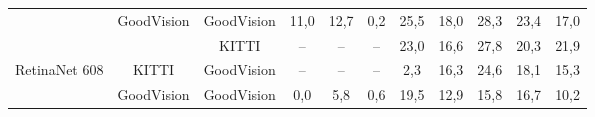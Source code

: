 \documentclass[twoside]{ctuthesis}
\theoremstyle{plain}
\theoremstyle{definition}
\theoremstyle{note}
\begin{document}
\begin{table}
{\begin{tabular}{|c|c|c|c|c|c|c|c|c|c|c|}
                                                         & GoodVision                                                          & GoodVision                                                         & 11,0                                                                   & 12,7                                                               & 0,2                                                                       & 25,5                                                               & 18,0                                                                  & 28,3                                                                 & 23,4                                                               & 17,0                                                            \\ \cline{2-11} 
                                                         &                                                                     & KITTI                                                              & --                                                                     & --                                                                 & --                                                                        & 23,0                                                               & 16,6                                                                  & 27,8                                                                 & 20,3                                                               & 21,9                                                            \\ \cline{3-11} 
\multirow{-3}{*}{RetinaNet 608}                          & \multirow{-2}{*}{KITTI}                                             & GoodVision                                                         & --                                                                     & --                                                                 & --                                                                        & 2,3                                                                & 16,3                                                                  & 24,6                                                                 & 18,1                                                               & 15,3                                                            \\ \hline
                                                         & GoodVision                                                          & GoodVision                                                         & 0,0                                                                    & 5,8                                                                & 0,6                                                                       & 19,5                                                               & 12,9                                                                  & 15,8                                                                 & 16,7                                                               & 10,2                                                            \\ \cline{2-11} 

\end{tabular}}
\end{table}
\end{document}
